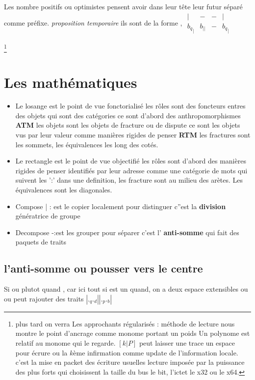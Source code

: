 \documentclass{article}
\begin{document}
Les nombre positifs ou optimistes  pensent avoir   dans  leur tête  leur futur séparé comme préfixe. \emph{proposition temporaire } ils sont  de la forme  
, $\begin{matrix} | &- &-& | \\ {b_q}_| &b_{||}&-&{b_q}_| \end{matrix}$ 


\footnote{ plus tard on verra
Les approchants régularisés : méthode de lecture nous montre le point d'ancrage comme monome portant un poids
Un polynome  est relatif au  monome qui le regarde.  $[k|P]$     peut laisser une trace un espace pour écrure ou la $k$ème infirmation comme update de l'information locale. c'est la mise en packet des écriture usuelles lecture imposée par la puissance des plus forts qui choisissent la taille du bus le bit, l'ictet le x32 ou le x64.}


\section{Les mathématiques}
\begin{itemize}
\item Le losange est le point de vue fonctorialisé les rôles sont des foncteurs entres des objets qui sont des catégories ce sont d'abord des anthropomorphismes \textbf{ ATM} les objets sont les objets de fracture ou de dispute ce sont les objets vus par leur valeur  comme  manières rigides de penser \textbf{RTM}
les fractures sont les sommets, les équivalences les long des cotés.
\item Le rectangle est le point de vue objectifié les rôles sont d'abord des manières rigides de penser  identifiés par leur adresse comme une catégorie de mots qui suivent les ':' dans une definition, les fracture sont au milieu des arètes. Les équivalences sont les diagonales.
\item Compose | :  est le copier localement   pour distinguer c''est la \textbf {division } génératrice de groupe
\item Decompose -:est les grouper pour séparer c'est l' \textbf{anti-somme} qui fait des paquets de traits
\end {itemize}

\subsection{l'anti-somme ou pousser vers le centre }
Si ou plutot quand , car ici tout si est un quand,  
on a deux espace extensibles ou ou peut rajouter des traits $|._q ._d | | ._p    ._b|$
\end{document}
